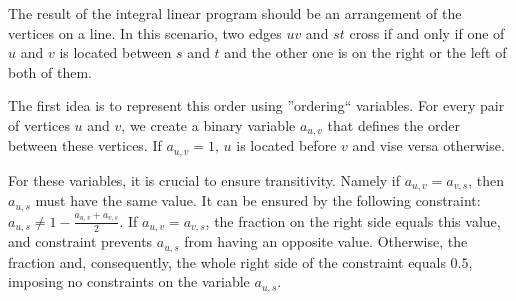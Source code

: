 \documentclass{article}
\begin{document}
The result of the integral linear program should be an arrangement of the vertices on a line. In this scenario, two edges $uv$ and $st$ cross if and only if one of $u$ and $v$ is located between $s$ and $t$ and the other one is on the right or the left of both of them.

The first idea is to represent this order using ''ordering`` variables. For every pair of vertices $u$ and $v$, we create a binary variable $a_{u, v}$ that defines the order between these vertices. If $a_{u, v} =1$, $u$ is located before $v$ and vise versa otherwise.

For these variables, it is crucial to ensure transitivity. Namely if $a_{u, v} = a_{v, s}$, then $a_{u, s}$ must have the same value. It can be ensured by the following constraint: $a_{u, s} \neq 1-\frac{a_{u,v} + a_{v,s}}{2}$. If  $a_{u, v} = a_{v, s}$, the fraction on the right side equals this value, and constraint prevents $a_{u,s}$ from having an opposite value. Otherwise, the fraction and, consequently, the whole right side of the constraint equals $0.5$, imposing no constraints on the variable $a_{u,s}$.
\end{document}
